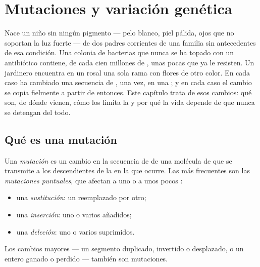 \chapter{Mutaciones y variación genética}\label{ch:g11:mutations}

Nace un niño sin ningún pigmento --- pelo blanco, piel pálida, ojos que
no soportan la luz fuerte --- de dos padres corrientes de una familia
sin antecedentes de esa condición. Una colonia de bacterias que nunca
se ha topado con un antibiótico contiene, de cada cien millones de
, unas pocas que ya le resisten. Un jardinero encuentra en un
rosal una sola rama con flores de otro color. En cada caso ha cambiado
una secuencia de , una vez, en una ; y en cada caso el cambio
se copia fielmente a partir de entonces. Este capítulo trata de esos
cambios: qué son, de dónde vienen, cómo los limita la  y por qué
la vida depende de que nunca se detengan del todo.

\section{Qué es una mutación}

\begin{definition}[Mutación]\label{def:g11:mutations:mutation}
Una \emph{mutación} es un cambio en la secuencia de
 de una molécula de  que se transmite a los
descendientes de la  en la que ocurre. Las más frecuentes son las
\emph{mutaciones puntuales}, que afectan a uno o a unos pocos
:
\begin{itemize}
  \item una \emph{sustitución}: un  reemplazado por otro;
  \item una \emph{inserción}: uno o varios  añadidos;
  \item una \emph{deleción}: uno o varios  suprimidos.
\end{itemize}
Los cambios mayores --- un segmento duplicado, invertido o desplazado,
o un  entero ganado o perdido --- también son mutaciones.
\end{definition}

